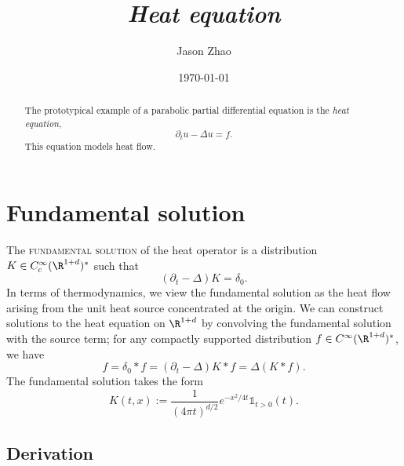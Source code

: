 \documentclass[reqno]{amsart}
\title
{
	\emph{Heat equation}
}
\author{Jason Zhao}
\date{\today}
\theoremstyle{definition}
\theoremstyle{remark}
\renewcommand{\emph}{\textsc}
\begin{document}
\maketitle

\begin{abstract}
	The prototypical example of a parabolic partial differential equation is the \textit{heat equation},
		\[ \partial_t u - \Delta u = f. \]
	This equation models	 heat flow. 
\end{abstract}

\tableofcontents

\section{Fundamental solution}

The \emph{fundamental solution} of the heat operator is a distribution $K \in C^\infty_c (\R^{1 + d})^*$ such that 
	\[  (\partial_t - \Delta) K = \delta_0. \]
In terms of thermodynamics, we view the fundamental solution as the heat flow arising from the unit heat source concentrated at the origin. We can construct solutions to the heat equation on $\R^{1 + d}$ by convolving the fundamental solution with the source term; for any compactly supported distribution $f\in C^\infty (\R^{1 + d})^*$, we have
	\[ f = \delta_0 * f = (\partial_t - \Delta)K * f = \Delta (K * f). \]
The fundamental solution takes the form 
	\[ K(t, x) := \frac{1}{(4\pi t)^{d/2}} e^{-x^2/4t} \mathbb 1_{t > 0} (t). \]

\subsection{Derivation}
\end{document}
